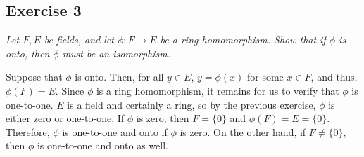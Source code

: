\subsection*{Exercise 3}
\textit{Let $F,E$ be fields, and let $\phi: F \rightarrow E$ be a ring homomorphism. Show that if $\phi$ is onto, then $\phi$ must be an isomorphism.}

\vspace{5 mm}
Suppose that $\phi$ is onto. Then, for all $y \in E$, $y = \phi(x)$ for some $x \in F$, and thus, $\phi(F) = E$. Since $\phi$ is a ring homomorphism, it remains for us to verify that $\phi$ is one-to-one. $E$ is a field and certainly a ring, so by the previous exercise, $\phi$ is either zero or one-to-one. If $\phi$ is zero, then $F = \{0\}$ and $\phi(F) = E = \{0\}$. Therefore, $\phi$ is one-to-one and onto if $\phi$ is zero. On the other hand, if $F \ne \{0\}$, then $\phi$ is one-to-one and onto as well.